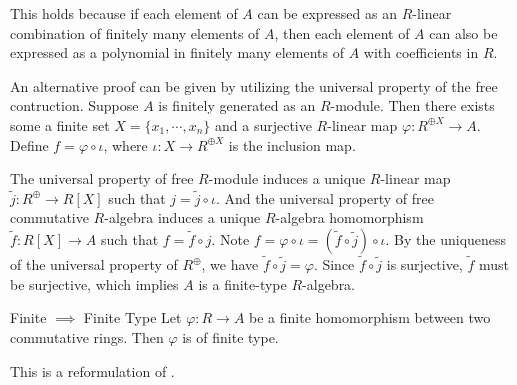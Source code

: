 \begin{prf}
    This holds because if each element of $A$ can be expressed as an $R$-linear combination of finitely many elements of $A$, then each element of $A$ can also be expressed as a polynomial in finitely many elements of $A$ with coefficients in $R$.

    An alternative proof can be given by utilizing the universal property of the free contruction. Suppose $A$ is finitely generated as an $R$-module. Then there exists some a finite set $X=\{x_1,\cdots,x_n\}$ and a surjective $R$-linear map $\varphi:R^{\oplus X}\to A$. Define $f=\varphi\circ \iota$, where $\iota:X\to R^{\oplus X}$ is the inclusion map. 
     \begin{center}
    \end{center}
    The universal property of free $R$-module induces a unique $R$-linear map $\widetilde{j}:R^{\oplus}\to R[X]$ such that $j=\widetilde{j}\circ \iota$. And the universal property of free commutative $R$-algebra induces a unique $R$-algebra homomorphism $\widetilde{f}:R[X]\to A$ such that $f=\widetilde{f}\circ j$. Note $f=\varphi\circ \iota=\left(\widetilde{f}\circ \widetilde{j}\right)\circ \iota$. By the uniqueness of the universal property of $R^{\oplus}$, we have $\widetilde{f}\circ \widetilde{j}=\varphi$. Since $\widetilde{f}\circ \widetilde{j}$ is surjective, $\widetilde{f}$ must be surjective, which implies $A$ is a finite-type $R$-algebra.
\end{prf}

\begin{corollary}{Finite $\implies$ Finite Type}{}
    Let $\varphi:R\to A$ be a finite homomorphism between two commutative rings. Then $\varphi$ is of finite type.
\end{corollary}
\begin{prf}
    This is a reformulation of .
\end{prf}



